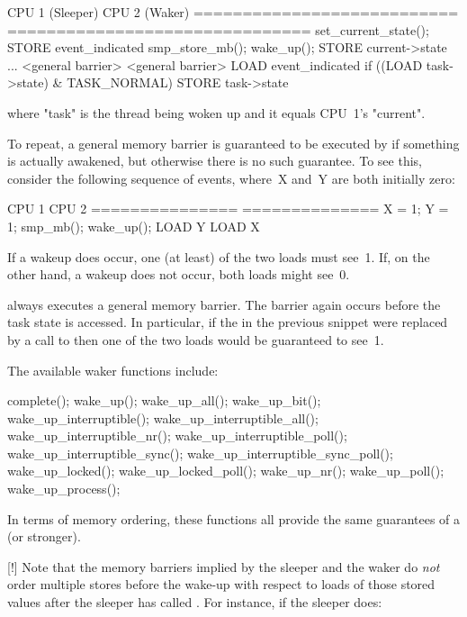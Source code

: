 \begin{VerbatimU}
	CPU 1 (Sleeper)             CPU 2 (Waker)
	=========================== ===============================
	set_current_state();        STORE event_indicated
	  smp_store_mb();           wake_up();
	    STORE current->state      ...
	    <general barrier>         <general barrier>
	LOAD event_indicated          if ((LOAD task->state) & TASK_NORMAL)
	                                STORE task->state
\end{VerbatimU}

where "task" is the thread being woken up and it equals CPU~1's "current".

To repeat, a general memory barrier is guaranteed to be executed by
 if something is actually awakened, but otherwise there is
no such guarantee.
To see this, consider the following sequence of events, where~X and~Y are both
initially zero:

\begin{VerbatimU}
	CPU 1           CPU 2
	=============== ==============
	X = 1;          Y = 1;
	smp_mb();       wake_up();
	LOAD Y          LOAD X
\end{VerbatimU}

If a wakeup does occur, one (at least) of the two loads must see~1.
If, on the other hand, a wakeup does not occur, both loads might see~0.

 always executes a general memory barrier.
The barrier again occurs before the task state is accessed.
In particular, if the  in the previous snippet were replaced
by a call to  then one of the two loads would be
guaranteed to see~1.

The available waker functions include:

\begin{VerbatimU}
	complete();
	wake_up();
	wake_up_all();
	wake_up_bit();
	wake_up_interruptible();
	wake_up_interruptible_all();
	wake_up_interruptible_nr();
	wake_up_interruptible_poll();
	wake_up_interruptible_sync();
	wake_up_interruptible_sync_poll();
	wake_up_locked();
	wake_up_locked_poll();
	wake_up_nr();
	wake_up_poll();
	wake_up_process();
\end{VerbatimU}

In terms of memory ordering, these functions all provide the same guarantees of
a  (or stronger).

[!] Note that the memory barriers implied by the sleeper and the waker do
\emph{not} order multiple stores before the wake-up with respect to loads
of those stored values after the sleeper has called .
For instance, if the sleeper does:

